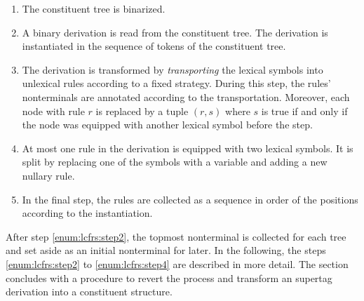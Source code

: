 \documentclass[../../document.tex]{subfiles}
\begin{document}
    \begin{enumerate}
        \item The constituent tree is binarized.
        \item\label{enum:lcfrs:step2}
            A binary  derivation is read from the constituent tree.
            The derivation is instantiated in the sequence of tokens of the constituent tree.
        \item\label{enum:lcfrs:step3}
            The derivation is transformed by \emph{transporting} the lexical symbols into unlexical rules according to a fixed strategy.
            During this step, the rules' nonterminals are annotated according to the transportation.
            Moreover, each node with rule \(r\) is replaced by a tuple \((r, s)\) where \(s\) is true if and only if the node was equipped with another lexical symbol before the step.
        \item\label{enum:lcfrs:step4}
            At most one rule in the derivation is equipped with two lexical symbols.
            It is split by replacing one of the symbols with a variable and adding a new nullary rule.
        \item
            In the final step, the rules are collected as a sequence in order of the positions according to the instantiation.
    \end{enumerate}
    After step \ref{enum:lcfrs:step2}, the topmost  nonterminal is collected for each tree and set aside as an initial nonterminal for later.
    In the following, the steps \ref{enum:lcfrs:step2} to \ref{enum:lcfrs:step4} are described in more detail.
    The section concludes with a procedure to revert the process and transform an  supertag derivation into a constituent structure.
\end{document}
